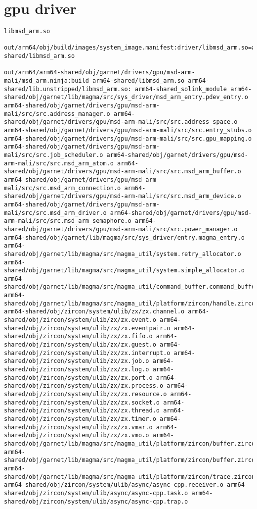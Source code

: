 \section{gpu driver}
\begin{verbatim}
libmsd_arm.so

out/arm64/obj/build/images/system_image.manifest:driver/libmsd_arm.so=arm64-shared/libmsd_arm.so

out/arm64/arm64-shared/obj/garnet/drivers/gpu/msd-arm-mali/msd_arm.ninja:build arm64-shared/libmsd_arm.so arm64-shared/lib.unstripped/libmsd_arm.so: arm64-shared_solink_module arm64-shared/obj/garnet/lib/magma/src/sys_driver/msd_arm_entry.pdev_entry.o arm64-shared/obj/garnet/drivers/gpu/msd-arm-mali/src/src.address_manager.o arm64-shared/obj/garnet/drivers/gpu/msd-arm-mali/src/src.address_space.o arm64-shared/obj/garnet/drivers/gpu/msd-arm-mali/src/src.entry_stubs.o arm64-shared/obj/garnet/drivers/gpu/msd-arm-mali/src/src.gpu_mapping.o arm64-shared/obj/garnet/drivers/gpu/msd-arm-mali/src/src.job_scheduler.o arm64-shared/obj/garnet/drivers/gpu/msd-arm-mali/src/src.msd_arm_atom.o arm64-shared/obj/garnet/drivers/gpu/msd-arm-mali/src/src.msd_arm_buffer.o arm64-shared/obj/garnet/drivers/gpu/msd-arm-mali/src/src.msd_arm_connection.o arm64-shared/obj/garnet/drivers/gpu/msd-arm-mali/src/src.msd_arm_device.o arm64-shared/obj/garnet/drivers/gpu/msd-arm-mali/src/src.msd_arm_driver.o arm64-shared/obj/garnet/drivers/gpu/msd-arm-mali/src/src.msd_arm_semaphore.o arm64-shared/obj/garnet/drivers/gpu/msd-arm-mali/src/src.power_manager.o arm64-shared/obj/garnet/lib/magma/src/sys_driver/entry.magma_entry.o arm64-shared/obj/garnet/lib/magma/src/magma_util/system.retry_allocator.o arm64-shared/obj/garnet/lib/magma/src/magma_util/system.simple_allocator.o arm64-shared/obj/garnet/lib/magma/src/magma_util/command_buffer.command_buffer.o arm64-shared/obj/garnet/lib/magma/src/magma_util/platform/zircon/handle.zircon_platform_handle.o arm64-shared/obj/zircon/system/ulib/zx/zx.channel.o arm64-shared/obj/zircon/system/ulib/zx/zx.event.o arm64-shared/obj/zircon/system/ulib/zx/zx.eventpair.o arm64-shared/obj/zircon/system/ulib/zx/zx.fifo.o arm64-shared/obj/zircon/system/ulib/zx/zx.guest.o arm64-shared/obj/zircon/system/ulib/zx/zx.interrupt.o arm64-shared/obj/zircon/system/ulib/zx/zx.job.o arm64-shared/obj/zircon/system/ulib/zx/zx.log.o arm64-shared/obj/zircon/system/ulib/zx/zx.port.o arm64-shared/obj/zircon/system/ulib/zx/zx.process.o arm64-shared/obj/zircon/system/ulib/zx/zx.resource.o arm64-shared/obj/zircon/system/ulib/zx/zx.socket.o arm64-shared/obj/zircon/system/ulib/zx/zx.thread.o arm64-shared/obj/zircon/system/ulib/zx/zx.timer.o arm64-shared/obj/zircon/system/ulib/zx/zx.vmar.o arm64-shared/obj/zircon/system/ulib/zx/zx.vmo.o arm64-shared/obj/garnet/lib/magma/src/magma_util/platform/zircon/buffer.zircon_platform_buffer.o arm64-shared/obj/garnet/lib/magma/src/magma_util/platform/zircon/buffer.zircon_platform_bus_mapper.o arm64-shared/obj/garnet/lib/magma/src/magma_util/platform/zircon/trace.zircon_platform_trace.o arm64-shared/obj/zircon/system/ulib/async/async-cpp.receiver.o arm64-shared/obj/zircon/system/ulib/async/async-cpp.task.o arm64-shared/obj/zircon/system/ulib/async/async-cpp.trap.o 
\end{verbatim}
